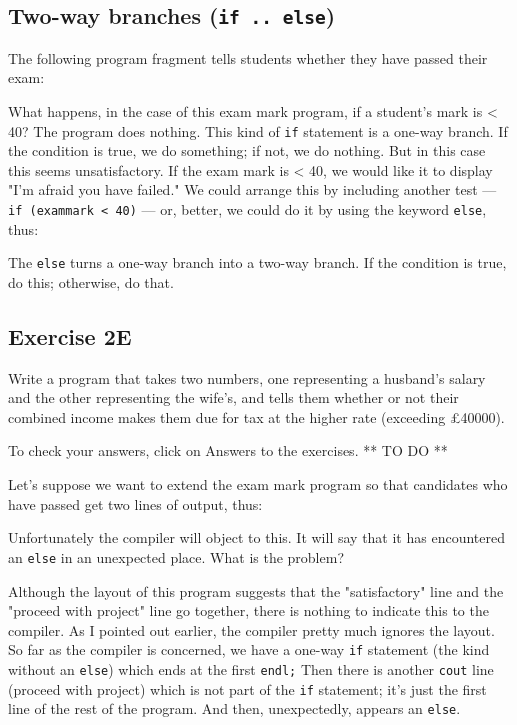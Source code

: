 \subsection{Two-way branches (\texttt{if .. else})}

The following program fragment tells students whether they have passed their exam:


What happens, in the case of this exam mark program, if a student's mark is
< 40?  The program does nothing.  This kind of \verb!if! statement is a
one-way branch.  If the condition is true, we do something; if not, we do
nothing.  But in this case
this seems unsatisfactory.  If the exam mark is < 40, we would like
it to display "I'm afraid you have failed."  We could arrange this by
including another test --- \verb!if (exammark < 40)!  --- or, better, we could
do it by using the keyword \verb!else!, thus:


The  \verb!else! turns a one-way branch into a two-way branch.  If the condition
is true, do this; otherwise, do that.

\subsection*{Exercise 2E}

Write a program that takes two numbers, one representing a
husband's salary and the other representing the wife's, and tells them
whether or not their combined income makes them due for tax at the higher rate
(exceeding \pounds 40000).

To check your answers, click on Answers to the exercises. ** TO DO **

Let's suppose we want to extend the exam mark program so that candidates who
have passed get two lines of output, thus:


Unfortunately the compiler will object to this.  It will say that it has
encountered an  \verb!else! in an unexpected place.  What is the problem?

Although the layout of this program suggests that the "satisfactory" line
and the "proceed with project" line go together, there is nothing to
indicate this to the compiler.  As I pointed out earlier, the compiler
pretty much ignores the layout.  So far as the compiler is concerned,
we have a one-way  \verb!if! statement (the kind without an  \verb!else!) which ends
at the first \verb!endl;!  Then there is another  \verb!cout! line (proceed with
project) which is not part of the  \verb!if! statement; it's just the first
line of the rest of the program.  And then, unexpectedly,
appears an  \verb!else!.

